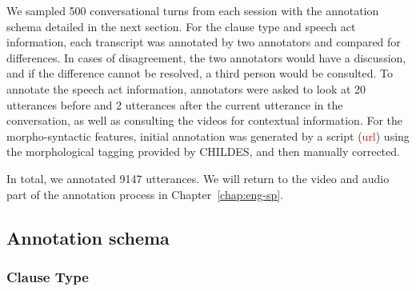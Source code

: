 We sampled 500 conversational turns from each session with the annotation schema detailed in the next section. For the clause type and speech act information, each transcript was annotated by two annotators and compared for differences. In cases of disagreement, the two annotators would have a discussion, and if the difference cannot be resolved, a third person would be consulted. To annotate the speech act information, annotators were asked to look at 20 utterances before and 2 utterances after the current utterance in the conversation, as well as consulting the videos for contextual information. For the morpho-syntactic features, initial annotation was generated by a script (\textcolor{red}{url}) using the morphological tagging provided by CHILDES, and then manually corrected. 

In total, we annotated 9147 utterances. We will return to the video and audio part of the annotation process in Chapter~\ref{chap:eng-sp}.




\subsection{Annotation schema}
\label{sec:engcl:corpus:schema}

\subsubsection{Clause Type}

